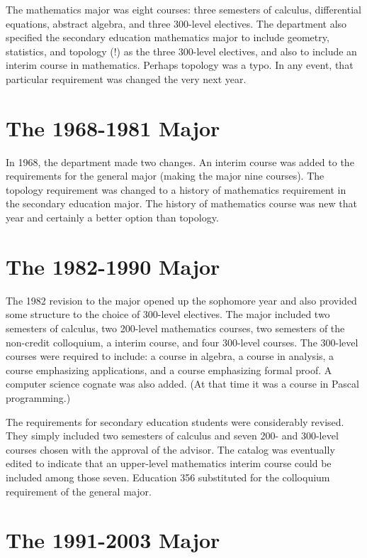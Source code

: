 \documentclass[
]{book}
\begin{document}
The mathematics major was eight courses: three semesters of calculus, differential equations, abstract algebra, and three 300-level electives. The department also specified the secondary education mathematics major to include geometry, statistics, and topology (!) as the three 300-level electives, and also to include an interim course in mathematics. Perhaps topology was a typo. In any event, that particular requirement was changed the very next year.

\hypertarget{the-1968-1981-major}{%
\section{The 1968-1981 Major}\label{the-1968-1981-major}}

In 1968, the department made two changes. An interim course was added to the requirements for the general major (making the major nine courses). The topology requirement was changed to a history of mathematics requirement in the secondary education major. The history of mathematics course was new that year and certainly a better option than topology.

\hypertarget{the-1982-1990-major}{%
\section{The 1982-1990 Major}\label{the-1982-1990-major}}

The 1982 revision to the major opened up the sophomore year and also provided some structure to the choice of 300-level electives. The major included two semesters of calculus, two 200-level mathematics courses, two semesters of the non-credit colloquium, a interim course, and four 300-level courses. The 300-level courses were required to include: a course in algebra, a course in analysis, a course emphasizing applications, and a course emphasizing formal proof. A computer science cognate was also added. (At that time it was a course in Pascal programming.)

The requirements for secondary education students were considerably revised. They simply included two semesters of calculus and seven 200- and 300-level courses chosen with the approval of the advisor. The catalog was eventually edited to indicate that an upper-level mathematics interim course could be included among those seven. Education 356 substituted for the colloquium requirement of the general major.

\hypertarget{the-1991-2003-major}{%
\section{The 1991-2003 Major}\label{the-1991-2003-major}}
\end{document}

